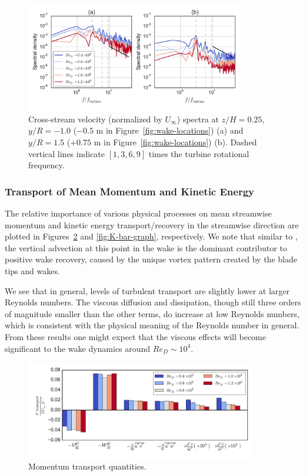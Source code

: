 \documentclass[energies,article,accept,moreauthors,pdftex,12pt,a4paper]{mdpi}
\begin{document}
\begin{figure}[ht!]
\centering

\includegraphics[width=0.85\textwidth]{figures/wake_spectra}

\caption{Cross-stream velocity (normalized by $U_\infty$) spectra at $z/H=0.25$,
    $y/R=-1.0$ ($-0.5$ m in Figure~\ref{fig:wake-locations}) (a) and $y/R=1.5$
    ($+0.75$ m in Figure~\ref{fig:wake-locations}) (b). Dashed vertical lines
    indicate $[1, 3, 6, 9]$ times the turbine rotational frequency.}

\label{fig:wake-spectra}
\end{figure}



\subsubsection{Transport of Mean Momentum and Kinetic Energy}

The relative importance of various physical processes on mean streamwise
momentum and kinetic energy transport/recovery in the streamwise direction are
plotted in Figures~\ref{fig:mom-bar-graph} and \ref{fig:K-bar-graph},
respectively. We note that similar to \cite{Bachant2015-JoT}, the vertical
advection at this point in the wake is the dominant contributor to positive wake
recovery, caused by the unique vortex pattern created by the blade tips and
wakes.

We see that in general, levels of turbulent transport are slightly lower at
larger Reynolds numbers. The viscous diffusion and dissipation, though still
three orders of magnitude smaller than the other terms, do increase at low
Reynolds numbers, which is consistent with the physical meaning of the Reynolds
number in general. From these results one might expect that the viscous effects
will become significant to the wake dynamics around $Re_D \sim 10^4$.

\begin{figure}[ht!]
\centering
\includegraphics[width=0.9\textwidth]{figures/mom_bar_graph}
\caption{Momentum transport quantities.}
\label{fig:mom-bar-graph}
\end{figure}
\end{document}
